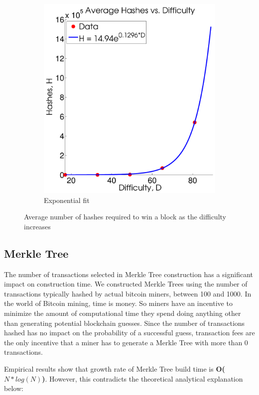 \documentclass[pdftex,11pt]{article}
\begin{document}
\begin{figure}[H]
\begin{subfigure}[H]{0.4\textwidth}
		\includegraphics[width=\textwidth]{figures/Exp.pdf}
		\caption{Exponential fit}
	\end{subfigure}
	\caption{Average number of hashes required to win a block as the difficulty increases}
	\label{fig:hash}
\end{figure}

\subsection{Merkle Tree}
The number of transactions selected in Merkle Tree construction has a significant impact on construction time. We constructed Merkle Trees using the number of transactions typically hashed by actual bitcoin miners, between 100 and 1000. In the world of Bitcoin mining, time is money. So miners have an incentive to minimize the amount of computational time they spend doing anything other than generating potential blockchain guesses. Since the number of transactions hashed has no impact on the probability of a successful guess, transaction fees are the only incentive that a miner has to generate a Merkle Tree with more than 0 transactions.

Empirical results show that growth rate of Merkle Tree build time is {\bf O($N*log(N)$)}. However, this contradicts the theoretical analytical explanation below:
\end{document}
